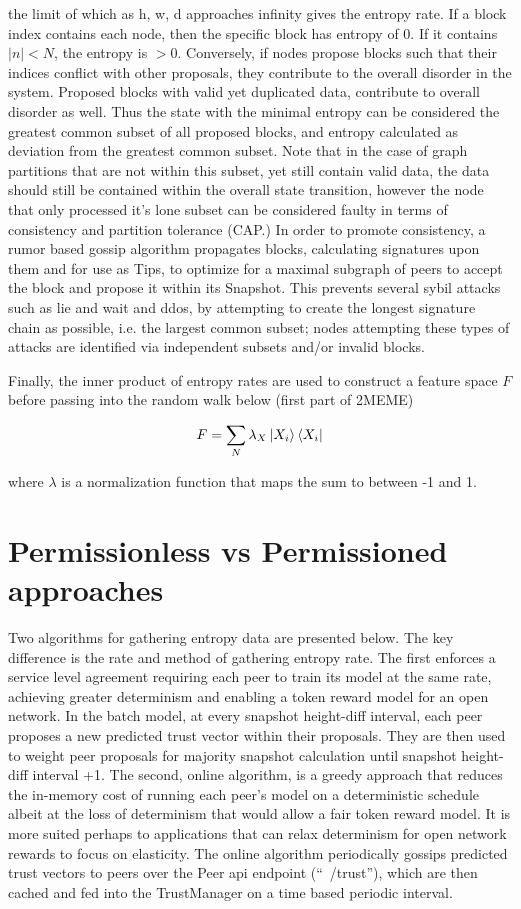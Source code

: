 \documentclass{article}
\begin{document}
	the limit of which as h, w, d approaches infinity gives the entropy rate.
If a block index contains each node, then the specific block has entropy of 0. If it contains $|n| < N$, the entropy is $> 0$. Conversely, if nodes propose blocks such that their indices conflict with other proposals, they contribute to the overall disorder in the system. Proposed blocks with valid yet duplicated data, contribute to overall disorder as well. Thus the state with the minimal entropy can be considered the greatest common subset of all proposed blocks, and entropy calculated as deviation from the greatest common subset. Note that in the case of graph partitions that are not within this subset, yet still contain valid data, the data should still be contained within the overall state transition, however the node that only processed it’s lone subset can be considered faulty in terms of consistency and partition tolerance (CAP.) In order to promote consistency, a rumor based gossip algorithm propagates blocks, calculating signatures upon them and for use as Tips, to optimize for a maximal subgraph of peers to accept the block and propose it within its Snapshot. This prevents several sybil attacks such as lie and wait and ddos, by attempting to create the longest signature chain as possible, i.e. the largest common subset; nodes attempting these types of attacks are identified via independent subsets and/or invalid blocks.

Finally, the inner product of entropy rates are used to construct a feature space $F$ before passing into the random walk below (first part of 2MEME)

\begin{equation}
F = \sum_N \lambda_X \ket{X_i} \bra{X_i}
\end{equation}

where $\lambda$ is a normalization function that maps the sum to between -1 and 1.

\section {Permissionless vs Permissioned approaches}
Two algorithms for gathering entropy data are presented below. The key difference is the rate and method of gathering entropy rate. The first enforces a service level agreement requiring each peer to train its model at the same rate, achieving greater determinism and enabling a token reward model for an open network. In the batch model, at every snapshot height-diff interval, each peer proposes a new predicted trust vector within their proposals. They are then used to weight peer proposals for majority snapshot calculation until snapshot height-diff interval +1.
The second, online algorithm, is a greedy approach that reduces the in-memory cost of running each peer’s model on a deterministic schedule albeit at the loss of determinism that would allow a fair token reward model. It is more suited perhaps to applications that can relax determinism for  open network rewards to focus on elasticity. The online algorithm periodically gossips predicted trust vectors to peers over the Peer api endpoint (“~/trust”), which are then cached and fed into the TrustManager on a time based periodic interval.
\end{document}
